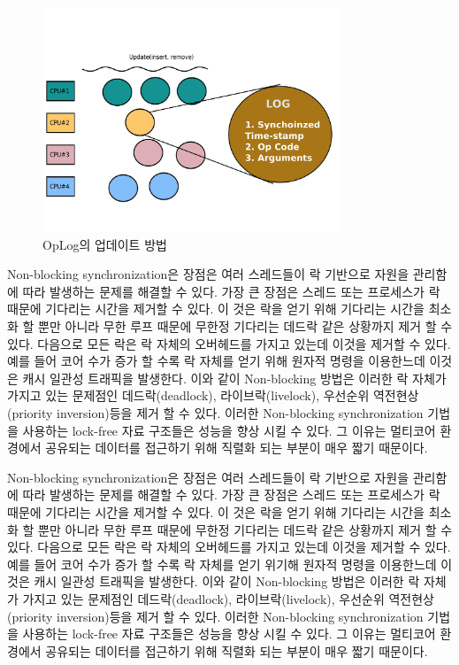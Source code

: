 \begin{figure}[h]
    \centering
    \includegraphics[width=0.8\textwidth]{fig/oplog_log}
    \caption{OpLog의 업데이트 방법}
  \label{fig:oplog}
\end{figure}


Non-blocking synchronization은 장점은 여러 스레드들이 락 기반으로 자원을 관리함에 따라
 발생하는 문제를 해결할 수 있다. 
가장 큰 장점은 스레드 또는 프로세스가 락 때문에 기다리는 시간을 제거할 수 있다.
이 것은 락을 얻기 위해 기다리는 시간을 최소화 할 뿐만 아니라 무한 루프 때문에 무한정 기다리는 
데드락 같은 상황까지 제거 할 수 있다. 
다음으로 모든 락은 락 자체의 오버헤드를 가지고 있는데 이것을 제거할 수 있다. 
예를 들어 코어 수가 증가 할 수록 락 자체를 얻기 위해 원자적 명령을 이용한느데 이것은 캐시 일관성 트래픽을 
발생한다. 
이와 같이 Non-blocking 방법은 이러한 락 자체가 가지고 있는 문제점인 데드락(deadlock), 라이브락(livelock), 
우선순위 역전현상(priority inversion)등을 제거 할 수 있다. 
이러한 Non-blocking synchronization 기법을 사용하는 lock-free 자료 구조들은 성능을 향상 시킬 수 있다. 
그 이유는 멀티코어 환경에서 공유되는 데이터를 접근하기 위해 직렬화 되는 부분이 매우 짧기 때문이다. 

Non-blocking synchronization은 장점은 여러 스레드들이 락 기반으로 자원을 관리함에 따라
 발생하는 문제를 해결할 수 있다. 
가장 큰 장점은 스레드 또는 프로세스가 락 때문에 기다리는 시간을 제거할 수 있다.
이 것은 락을 얻기 위해 기다리는 시간을 최소화 할 뿐만 아니라 무한 루프 때문에 무한정 기다리는 
데드락 같은 상황까지 제거 할 수 있다. 
다음으로 모든 락은 락 자체의 오버헤드를 가지고 있는데 이것을 제거할 수 있다. 
예를 들어 코어 수가 증가 할 수록 락 자체를 얻기 위기해 원자적 명령을 이용한느데 이것은 캐시 일관성 트래픽을 
발생한다. 
이와 같이 Non-blocking 방법은 이러한 락 자체가 가지고 있는 문제점인 데드락(deadlock), 라이브락(livelock), 
우선순위 역전현상(priority inversion)등을 제거 할 수 있다. 
이러한 Non-blocking synchronization 기법을 사용하는 lock-free 자료 구조들은 성능을 향상 시킬 수 있다. 
그 이유는 멀티코어 환경에서 공유되는 데이터를 접근하기 위해 직렬화 되는 부분이 매우 짧기 때문이다. 
